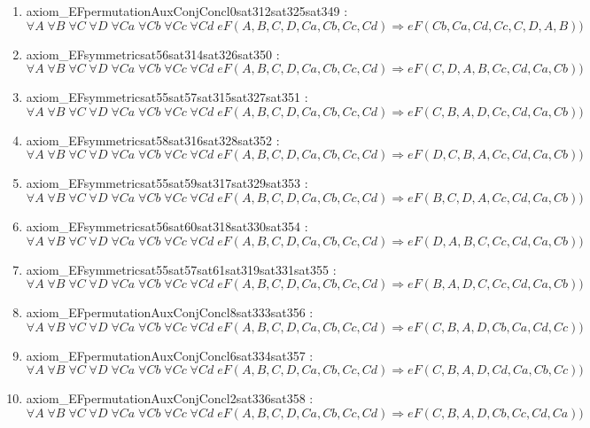 \documentclass{article}
\begin{document}
\begin{enumerate}
\item axiom\_EFpermutationAuxConjConcl0sat312sat325sat349 : $\forall A\;\forall B\;\forall C\;\forall D\;\forall Ca\;\forall Cb\;\forall Cc\;\forall Cd\;eF(A, B, C, D, Ca, Cb, Cc, Cd) \Rightarrow eF(Cb, Ca, Cd, Cc, C, D, A, B))$
\item axiom\_EFsymmetricsat56sat314sat326sat350 : $\forall A\;\forall B\;\forall C\;\forall D\;\forall Ca\;\forall Cb\;\forall Cc\;\forall Cd\;eF(A, B, C, D, Ca, Cb, Cc, Cd) \Rightarrow eF(C, D, A, B, Cc, Cd, Ca, Cb))$
\item axiom\_EFsymmetricsat55sat57sat315sat327sat351 : $\forall A\;\forall B\;\forall C\;\forall D\;\forall Ca\;\forall Cb\;\forall Cc\;\forall Cd\;eF(A, B, C, D, Ca, Cb, Cc, Cd) \Rightarrow eF(C, B, A, D, Cc, Cd, Ca, Cb))$
\item axiom\_EFsymmetricsat58sat316sat328sat352 : $\forall A\;\forall B\;\forall C\;\forall D\;\forall Ca\;\forall Cb\;\forall Cc\;\forall Cd\;eF(A, B, C, D, Ca, Cb, Cc, Cd) \Rightarrow eF(D, C, B, A, Cc, Cd, Ca, Cb))$
\item axiom\_EFsymmetricsat55sat59sat317sat329sat353 : $\forall A\;\forall B\;\forall C\;\forall D\;\forall Ca\;\forall Cb\;\forall Cc\;\forall Cd\;eF(A, B, C, D, Ca, Cb, Cc, Cd) \Rightarrow eF(B, C, D, A, Cc, Cd, Ca, Cb))$
\item axiom\_EFsymmetricsat56sat60sat318sat330sat354 : $\forall A\;\forall B\;\forall C\;\forall D\;\forall Ca\;\forall Cb\;\forall Cc\;\forall Cd\;eF(A, B, C, D, Ca, Cb, Cc, Cd) \Rightarrow eF(D, A, B, C, Cc, Cd, Ca, Cb))$
\item axiom\_EFsymmetricsat55sat57sat61sat319sat331sat355 : $\forall A\;\forall B\;\forall C\;\forall D\;\forall Ca\;\forall Cb\;\forall Cc\;\forall Cd\;eF(A, B, C, D, Ca, Cb, Cc, Cd) \Rightarrow eF(B, A, D, C, Cc, Cd, Ca, Cb))$
\item axiom\_EFpermutationAuxConjConcl8sat333sat356 : $\forall A\;\forall B\;\forall C\;\forall D\;\forall Ca\;\forall Cb\;\forall Cc\;\forall Cd\;eF(A, B, C, D, Ca, Cb, Cc, Cd) \Rightarrow eF(C, B, A, D, Cb, Ca, Cd, Cc))$
\item axiom\_EFpermutationAuxConjConcl6sat334sat357 : $\forall A\;\forall B\;\forall C\;\forall D\;\forall Ca\;\forall Cb\;\forall Cc\;\forall Cd\;eF(A, B, C, D, Ca, Cb, Cc, Cd) \Rightarrow eF(C, B, A, D, Cd, Ca, Cb, Cc))$
\item axiom\_EFpermutationAuxConjConcl2sat336sat358 : $\forall A\;\forall B\;\forall C\;\forall D\;\forall Ca\;\forall Cb\;\forall Cc\;\forall Cd\;eF(A, B, C, D, Ca, Cb, Cc, Cd) \Rightarrow eF(C, B, A, D, Cb, Cc, Cd, Ca))$

\end{enumerate}
\end{document}
